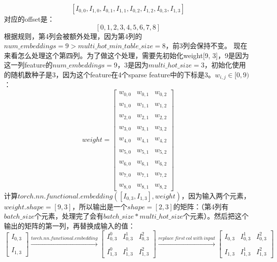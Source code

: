 \documentclass{article}
\begin{document}
$$
[I_{0,0}, I_{1,0}, I_{0,1}, I_{1,1}, I_{0,2}, I_{1,2}, I_{0,3}, I_{1,3}]
$$
对应的offset是：
$$
[0, 1, 2, 3, 4, 5 ,6, 7, 8]
$$
根据规则，第4列会被额外处理，因为第4列的$num\_embeddings=9>multi\_hot\_min\_table\_size=8$，前3列会保持不变。\newline
现在来看怎么处理这个第四列。为了做这个处理，需要先初始化weight[9, 3]，9是因为这一列feature的$num\_embeddings=9$，3是因为$multi\_hot\_size=3$，初始化使用的随机数种子是3，因为这个feature在4个sparse feature中的下标是3。$w_{i,j}\in [0,9)$：\newline
$$
weight = 
\begin{bmatrix}
    w_{0,0} & w_{0,1} & w_{0,2} \\\\
    w_{1,0} & w_{1,1} & w_{1,2} \\\\
    w_{2,0} & w_{2,1} & w_{2,2} \\\\
    w_{3,0} & w_{3,1} & w_{3,2} \\\\
    w_{4,0} & w_{4,1} & w_{4,2} \\\\
    w_{5,0} & w_{5,1} & w_{5,2} \\\\
    w_{6,0} & w_{6,1} & w_{6,2} \\\\
    w_{7,0} & w_{7,1} & w_{7,2} \\\\
    w_{8,0} & w_{8,1} & w_{8,2} 
\end{bmatrix}
$$
计算$torch.nn.functional.embedding([I_{0,3}, I_{1,3}], weight)$，因为输入两个元素，$weight.shape=[9,3]$，所以输出是一个$shape=[2,3]$的矩阵：（第4列有$batch\_size$个元素，处理完了会有$batch\_size*multi\_hot\_size$个元素）。然后把这个输出的矩阵的第一列，再替换成输入的值：
$$
\begin{bmatrix}
    I_{0,3} \\\\
    I_{1,3}
\end{bmatrix}
\stackrel{torch.nn.functional.embedding}{\longrightarrow}
\begin{bmatrix}
    I_{0,3}^0 & I_{0,3}^1 & I_{0,3}^2 \\\\
    I_{1,3}^0 & I_{1,3}^1 & I_{1,3}^2 
\end{bmatrix}
\stackrel{replace\ first\ col\ with\ input}{\longrightarrow}
\begin{bmatrix}
    I_{0,3} & I_{0,3}^1 & I_{0,3}^2 \\\\
    I_{1,3} & I_{1,3}^1 & I_{1,3}^2 
\end{bmatrix}
$$
\end{document}
